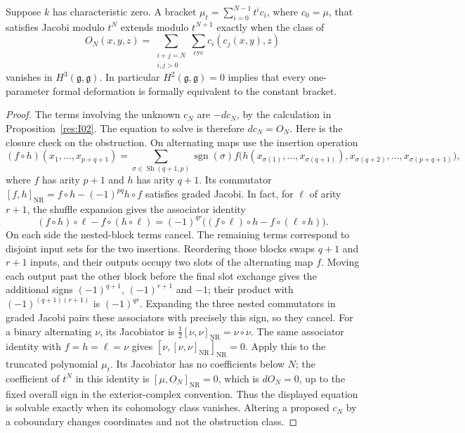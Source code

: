 \begin{proposition}\label{res:I03}
Suppose \(k\) has characteristic zero. A bracket
\(\mu_t=\sum_{i=0}^{N-1}t^i c_i\), where \(c_0=\mu\), that satisfies
Jacobi modulo \(t^N\) extends modulo \(t^{N+1}\) exactly when the class
of
\[
 O_N(x,y,z)=
 \sum_{\substack{i+j=N\\i,j>0}}
 \sum_{\mathrm{cyc}}c_i(c_j(x,y),z)
 \tag{9.2}\label{eq:lie-obstruction}
\]
vanishes in \(H^3(\mathfrak g,\mathfrak g)\). In particular
\(H^2(\mathfrak g,\mathfrak g)=0\) implies that every one-parameter
formal deformation is formally equivalent to the constant bracket.
\end{proposition}
\begin{proof}
The terms involving the unknown \(c_N\) are \(-dc_N\), by the
calculation in Proposition~\ref{res:I02}. The equation to solve is
therefore \(dc_N=O_N\).
Here is the closure check on the obstruction. On alternating maps use
the insertion operation
\[
 (f\circ h)(x_1,\ldots,x_{p+q+1})
 =\sum_{\sigma\in\operatorname{Sh}(q+1,p)}
 \operatorname{sgn}(\sigma)
 f\bigl(h(x_{\sigma(1)},\ldots,x_{\sigma(q+1)}),
          x_{\sigma(q+2)},\ldots,x_{\sigma(p+q+1)}\bigr),
\]
where \(f\) has arity \(p+1\) and \(h\) has arity \(q+1\).
Its commutator
\([f,h]_{\mathrm{NR}}=f\circ h-(-1)^{pq}h\circ f\)
satisfies graded Jacobi. In fact, for \(\ell\) of arity
\(r+1\), the shuffle expansion gives the associator identity
\[
 (f\circ h)\circ \ell-f\circ(h\circ \ell)
   =(-1)^{qr}\bigl((f\circ \ell)\circ h-f\circ(\ell\circ h)\bigr).
\]
On each side the nested-block terms cancel. The remaining terms
correspond to disjoint input sets for the two insertions.
Reordering those blocks swaps \(q+1\) and \(r+1\) inputs,
and their outputs occupy two slots of the alternating map \(f\).
Moving each output past the other block before the final slot
exchange gives the additional signs
\((-1)^{q+1}\), \((-1)^{r+1}\) and \(-1\); their product
with \((-1)^{(q+1)(r+1)}\) is \((-1)^{qr}\).
Expanding the three nested commutators in graded Jacobi pairs
these associators with precisely this sign, so they cancel.
For a binary alternating \(\nu\), its Jacobiator is
\(\tfrac12[\nu,\nu]_{\mathrm{NR}}=\nu\circ\nu\).
The same associator identity with \(f=h=\ell=\nu\) gives
\([\nu,[\nu,\nu]_{\mathrm{NR}}]_{\mathrm{NR}}=0\).
Apply this to the truncated polynomial \(\mu_t\). Its Jacobiator has
no coefficients below \(N\); the coefficient of \(t^N\) in this
identity is \([\mu,O_N]_{\mathrm{NR}}=0\), which is \(dO_N=0\),
up to the fixed overall sign in the exterior-complex convention.
Thus the displayed equation is solvable exactly when its cohomology
class vanishes. Altering a proposed \(c_N\) by a coboundary changes
coordinates and not the obstruction class.


\end{proof}
